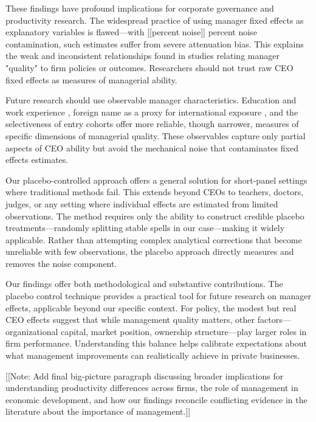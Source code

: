 \documentclass[11pt,a4paper]{article}
\begin{document}
These findings have profound implications for corporate governance and productivity research. The widespread practice of using manager fixed effects as explanatory variables is flawed—with [[percent noise]] percent noise contamination, such estimates suffer from severe attenuation bias. This explains the weak and inconsistent relationships found in studies relating manager "quality" to firm policies or outcomes. Researchers should not trust raw CEO fixed effects as measures of managerial ability.

Future research should use observable manager characteristics. Education and work experience \citep{DePirro2025}, foreign name as a proxy for international exposure \citep{Koren2023expat}, and the selectiveness of entry cohorts \citep{koren2024managers} offer more reliable, though narrower, measures of specific dimensions of managerial quality. These observables capture only partial aspects of CEO ability but avoid the mechanical noise that contaminates fixed effects estimates.

Our placebo-controlled approach offers a general solution for short-panel settings where traditional methods fail. This extends beyond CEOs to teachers, doctors, judges, or any setting where individual effects are estimated from limited observations. The method requires only the ability to construct credible placebo treatments—randomly splitting stable spells in our case—making it widely applicable. Rather than attempting complex analytical corrections that become unreliable with few observations, the placebo approach directly measures and removes the noise component.

Our findings offer both methodological and substantive contributions. The placebo control technique provides a practical tool for future research on manager effects, applicable beyond our specific context. For policy, the modest but real CEO effects suggest that while management quality matters, other factors—organizational capital, market position, ownership structure—play larger roles in firm performance. Understanding this balance helps calibrate expectations about what management improvements can realistically achieve in private businesses.

[[Note: Add final big-picture paragraph discussing broader implications for understanding productivity differences across firms, the role of management in economic development, and how our findings reconcile conflicting evidence in the literature about the importance of management.]]
\end{document}
